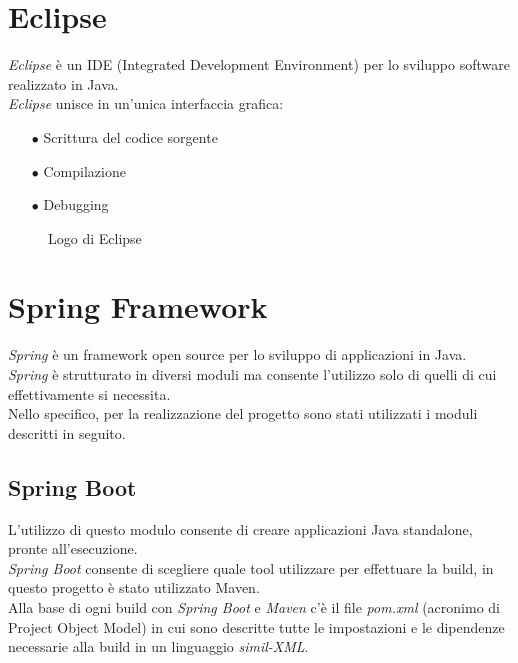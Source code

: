 \section{Eclipse}\label{sec:eclipse}
\emph{Eclipse} è un IDE (Integrated Development Environment) per lo sviluppo software realizzato in Java. \cite{Eclipse}\\
\emph{Eclipse} unisce in un'unica interfaccia grafica:
\begin{itemize}
	\item[$\bullet$]Scrittura del codice sorgente
	\item[$\bullet$]Compilazione
	\item[$\bullet$]Debugging
\end{itemize}
\begin{figure}[ht]
	\centering
	\caption{Logo di Eclipse}
	\label{fig:one}
\end{figure}

\section{Spring Framework}\label{sec:spring}
\emph{Spring} è un framework open source per lo sviluppo di applicazioni in Java.\\
\emph{Spring} è strutturato in diversi moduli ma consente l'utilizzo solo di quelli di cui effettivamente si necessita. \cite{SpringFramework}\\
Nello specifico, per la realizzazione del progetto sono stati utilizzati i moduli descritti in seguito.
\subsection{Spring Boot}\label{sec:springboot}
L'utilizzo di questo modulo consente di creare applicazioni Java standalone, pronte all'esecuzione. \cite{springBoot}\\
\emph{Spring Boot} consente di scegliere quale tool utilizzare per effettuare la build, in questo progetto è stato utilizzato Maven.\\
Alla base di ogni build con \emph{Spring Boot} e \emph{Maven} c'è il file \emph{pom.xml} (acronimo di Project Object Model) in cui sono descritte tutte le impostazioni e le dipendenze necessarie alla build in un linguaggio \emph{simil-XML}.
